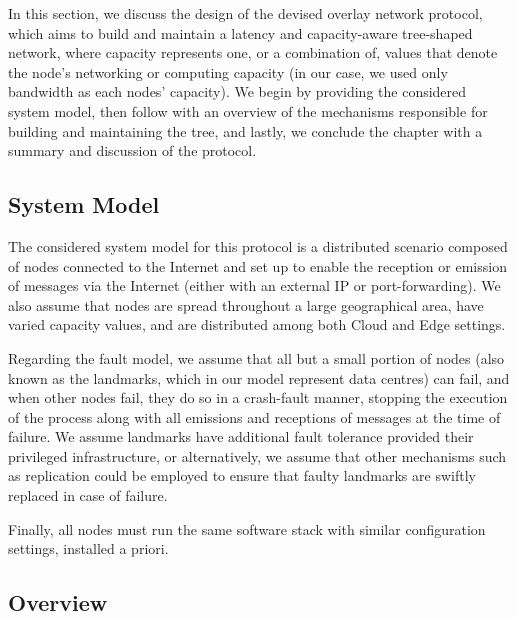 


In this section, we discuss the design of the devised overlay network protocol, which aims to build and maintain a latency and capacity-aware tree-shaped network, where capacity represents one, or a combination of, values that denote the node's networking or computing capacity (in our case, we used only bandwidth as each nodes' capacity). We begin by providing the considered system model, then follow with an overview of the mechanisms responsible for building and maintaining the tree, and lastly, we conclude the chapter with a summary and discussion of the protocol.

\subsection{System Model}

The considered system model for this protocol is a distributed scenario composed of nodes connected to the Internet and set up to enable the reception or emission of messages via the Internet (either with an external IP or port-forwarding). We also assume that nodes are spread throughout a large geographical area, have varied capacity values, and are distributed among both Cloud and Edge settings.

Regarding the fault model, we assume that all but a small portion of nodes (also known as the landmarks, which in our model represent data centres) can fail, and when other nodes fail, they do so in a crash-fault manner, stopping the execution of the process along with all emissions and receptions of messages at the time of failure. We assume landmarks have additional fault tolerance provided their privileged infrastructure, or alternatively, we assume that other mechanisms such as replication could be employed to ensure that faulty landmarks are swiftly replaced in case of failure. 
  
Finally, all nodes must run the same software stack with similar configuration settings, installed a priori.

\subsection{Overview}

